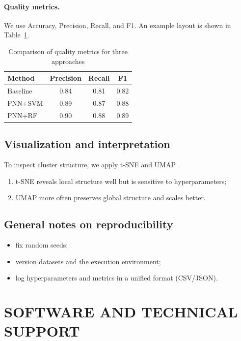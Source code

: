 \documentclass{article}
\begin{document}
\paragraph{Quality metrics.}
We use Accuracy, Precision, Recall, and F1. An example layout is shown in Table~\ref{tab:metrics}.
\begin{table}[htbp]
  \caption{Comparison of quality metrics for three approaches}
  \label{tab:metrics}
  \centering
  \begin{tabular}{lccc}
    \hline
    Method    & Precision & Recall & F1   \\
    \hline
    Baseline  & 0.84      & 0.81   & 0.82 \\
    PNN+SVM   & 0.89      & 0.87   & 0.88 \\
    PNN+RF    & 0.90      & 0.88   & 0.89 \\
    \hline
  \end{tabular}
\end{table}

\subsection{Visualization and interpretation}
To inspect cluster structure, we apply t-SNE \cite{tsne2008} and UMAP \cite{umap2018}.
\begin{enumerate}
  \item t-SNE reveals local structure well but is sensitive to hyperparameters;
  \item UMAP more often preserves global structure and scales better.
\end{enumerate}

\subsection{General notes on reproducibility}
\begin{itemize}
  \item fix random seeds;
  \item version datasets and the execution environment;
  \item log hyperparameters and metrics in a unified format (CSV/JSON).
\end{itemize}

\section{SOFTWARE AND TECHNICAL SUPPORT}
\end{document}
